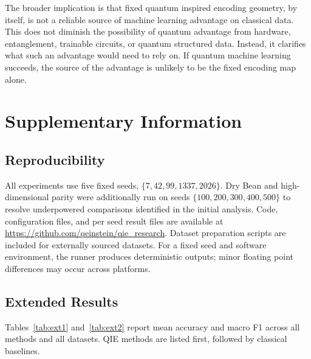 \documentclass[12pt]{article}
\begin{document}
The broader implication is that fixed quantum inspired encoding geometry, by
itself, is not a reliable source of machine learning advantage on classical
data. This does not diminish the possibility of quantum advantage from hardware,
entanglement, trainable circuits, or quantum structured data. Instead, it
clarifies what such an advantage would need to rely on. If quantum machine
learning succeeds, the source of the advantage is unlikely to be the fixed
encoding map alone.

\clearpage



\clearpage
\appendix

\section{Supplementary Information}
\label{sec:supplementary}

\subsection{Reproducibility}
\label{app:repro}

All experiments use five fixed seeds, $\{7,42,99,1337,2026\}$. Dry Bean and
  high-dimensional parity were additionally run on seeds $\{100,200,300,400,500\}$
  to resolve underpowered comparisons identified in the initial analysis. Code,
configuration files, and per seed result files are available at
\url{https://github.com/qeinstein/qie_research}. Dataset preparation scripts are
included for externally sourced datasets. For a fixed seed and software
environment, the runner produces deterministic outputs; minor floating point
differences may occur across platforms.

\subsection{Extended Results}
\label{app:extended}

Tables~\ref{tab:ext1} and~\ref{tab:ext2} report mean accuracy and macro F1
across all methods and all datasets. QIE methods are listed first, followed by
classical baselines.
\end{document}
